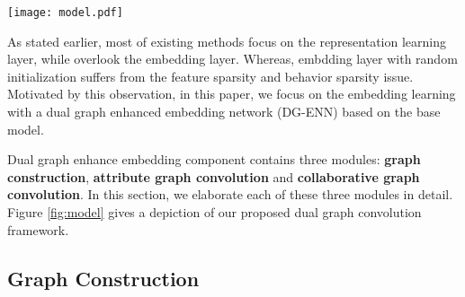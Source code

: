 \begin{figure*}
	\centering
	\setlength{\belowcaptionskip}{-0.3cm}
	\setlength{\abovecaptionskip}{0cm}
	\texttt{[image: model.pdf]}
	\caption{Overview of our proposed DG-ENN framework. The left part is the attribute graph convolution module, the central part is the collaborative graph convolution module and the right part is the deep network module.} 
	\label{fig:model}
\end{figure*}
As stated earlier, most of existing methods focus on the representation learning layer, while overlook the embedding layer. Whereas, embdding layer with random initialization suffers from the feature sparsity and behavior sparsity issue.
Motivated by this observation, in this paper, we focus on the embedding learning  with a dual graph enhanced embedding network (DG-ENN) based on the base model.

Dual graph enhance embedding component contains three modules: \textbf{graph construction}, \textbf{attribute graph convolution} and \textbf{collaborative graph convolution}. In this section, we elaborate each of these three modules in detail. Figure \ref{fig:model} gives a depiction of our proposed dual graph convolution framework.
\subsection{Graph Construction}
